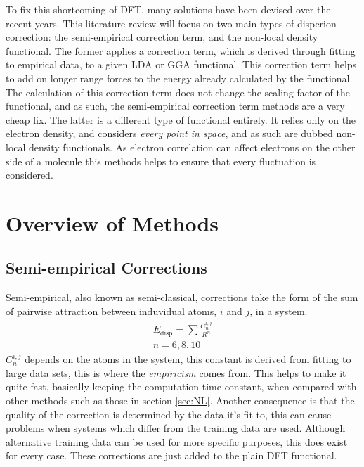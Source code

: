 \documentclass[10pt,a4paper,twocolumn,twoside]{extarticle}
\begin{document}
	To fix this shortcoming of DFT, many solutions have been devised over the recent years. This literature review will focus on two main types of disperion correction: the semi-empirical correction term, and the non-local density functional. The former applies a correction term, which is derived through fitting to empirical data, to a given LDA or GGA functional. This correction term helps to add on longer range forces to the energy already calculated by the functional. The calculation of this correction term does not change the scaling factor of the functional, and as such, the semi-empirical correction term methods are a very cheap fix. The latter is a different type of functional entirely. It relies only on the electron density, and considers \emph{every point in space}, and as such are dubbed non-local density functionals. As electron correlation can affect electrons on the other side of a molecule this methods helps to ensure that every fluctuation is considered.

	\section{Overview of Methods}
	\subsection{Semi-empirical Corrections}
	\label{sec:semi-empirical}
	Semi-empirical, also known as semi-classical, corrections take the form of the sum of pairwise attraction between induvidual atoms, $i$ and $j$, in a system.
	\begin{align}
		E_\text{disp} = \sum \frac{C^{i,j}_n}{R^n}\\ n = 6, 8, 10
	\end{align}
	$C^{i,j}_n$ depends on the atoms in the system, this constant is derived from fitting to large data sets, this is where the \emph{empiricism} comes from. This helps to make it quite fast, basically keeping the computation time constant, when compared with other methods such as those in section \ref{sec:NL}. Another consequence is that the quality of the correction is determined by the data it's fit to, this can cause problems when systems which differ from the training data are used. \cite{Sato2009, Grimme2010} Although alternative training data can be used for more specific purposes\cite{D3-ABC}, this does exist for every case. These corrections are just added to the plain DFT functional.
\end{document}

